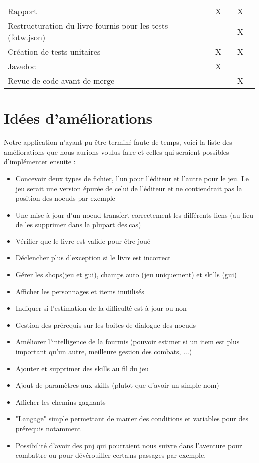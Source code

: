\begin{centering}
\begin{longtable}{|p{8cm}|c|c|c|c|}
			\rowcolor{lightgray} \multicolumn{5}{|c|}{ \textbf{Autre}}\\
			\hline
			Rapport & X & & X & \\
			\hline
			Restructuration du livre fournis pour les tests (fotw.json) & & & X & \\
			\hline
			Création de tests unitaires & X & & X & \\
			\hline
			Javadoc & X & & & \\
			\hline
			Revue de code avant de merge & & & X & \\
			\hline
		\end{longtable}
	\end{centering}

	\section{Idées d'améliorations}

		Notre application n'ayant pu être terminé faute de temps, voici la liste des améliorations que nous aurions voulus faire et celles qui seraient possibles d'implémenter ensuite :

		\begin{itemize}
			\item{Concevoir deux types de fichier, l'un pour l'éditeur et l'autre pour le jeu. Le jeu serait une version épurée de celui de l'éditeur et ne contiendrait pas la position des noeuds par exemple}
			\item{Une mise à jour d'un noeud transfert correctement les différents liens (au lieu de les supprimer dans la plupart des cas)}
			\item{Vérifier que le livre est valide pour être joué}
			\item{Déclencher plus d'exception si le livre est incorrect}
			\item{Gérer les shops(jeu et gui), champs auto (jeu uniquement) et skills (gui)}
			\item{Afficher les personnages et items inutilisés}
			\item{Indiquer si l'estimation de la difficulté est à jour ou non}
			\item{Gestion des prérequis sur les boites de dialogue des noeuds}
			\item{Améliorer l'intelligence de la fourmis (pouvoir estimer si un item est plus important qu'un autre, meilleure gestion des combats, ...)}
			\item{Ajouter et supprimer des skills au fil du jeu}
			\item{Ajout de paramètres aux skills (plutot que d'avoir un simple nom)}
			\item{Afficher les chemins gagnants}
			\item{"Langage" simple permettant de manier des conditions et variables pour des prérequis notamment}
			\item{Possibilité d'avoir des pnj qui pourraient nous suivre dans l'aventure pour combattre ou pour dévérouiller certains passages par exemple.}
		\end{itemize}

